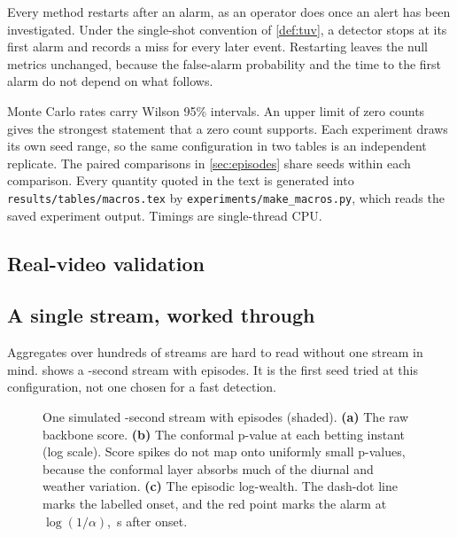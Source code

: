Every method restarts after an alarm, as an operator does once an alert has been
investigated. Under the single-shot convention of \cref{def:tuv}, a detector
stops at its first alarm and records a miss for every later event. Restarting
leaves the null metrics unchanged, because the false-alarm probability and the
time to the first alarm do not depend on what follows.


Monte Carlo rates carry Wilson 95\% intervals. An upper limit of zero counts
gives the strongest statement that a zero count supports. Each experiment draws
its own seed range, so the same configuration in two tables is an independent
replicate. The paired comparisons in \cref{sec:episodes} share seeds within each
comparison. Every quantity quoted in the text is generated into
\texttt{results/tables/macros.tex} by \texttt{experiments/make\_macros.py}, which
reads the saved experiment output. Timings are single-thread CPU.

\subsection{Real-video validation}
\label{sec:real-data}



\subsection{A single stream, worked through}
\label{sec:worked-example}

Aggregates over hundreds of streams are hard to read without one stream in mind.
 shows a \WorkedT{}-second stream with
\WorkedNEpisodes{} episodes. It is the first seed tried at this configuration,
not one chosen for a fast detection.

\begin{figure}[t]
  \centering
  \caption{One simulated \WorkedT{}-second stream with \WorkedNEpisodes{}
  episodes (shaded). \textbf{(a)} The raw backbone score. \textbf{(b)} The
  conformal p-value at each betting instant (log scale). Score spikes do not map
  onto uniformly small p-values, because the conformal layer absorbs much of the
  diurnal and weather variation. \textbf{(c)} The episodic log-wealth. The
  dash-dot line marks the labelled onset, and the red point marks the alarm at
  $\log(1/\alpha)$, \WorkedDelaySec{}\,s after onset.}
  \label{fig:worked-example}
\end{figure}

